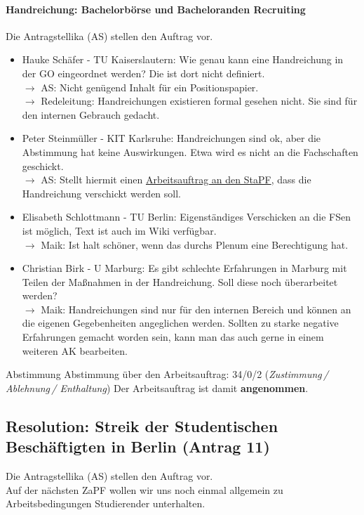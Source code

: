\paragraph{Handreichung: Bachelorbörse und Bacheloranden Recruiting}
    Die Antragstellika (AS) stellen den Auftrag vor.

    \begin{itemize}
      \item Hauke Schäfer - TU Kaiserslautern:  Wie genau kann eine Handreichung in der GO eingeordnet werden? Die ist dort nicht definiert. \\
        $\rightarrow$ AS: Nicht genügend Inhalt für ein Positionspapier. \\
        $\rightarrow$ Redeleitung: Handreichungen existieren formal gesehen nicht. Sie sind für den internen Gebrauch gedacht.
      \item Peter Steinmüller - KIT Karlsruhe:  Handreichungen sind ok, aber die Abstimmung hat keine Auswirkungen. Etwa wird es nicht an die Fachschaften geschickt. \\
        $\rightarrow$ AS: Stellt hiermit einen \uline{Arbeitsauftrag an den StaPF}, dass die Handreichung verschickt werden soll.
      \item Elisabeth Schlottmann - TU Berlin:  Eigenständiges Verschicken an die FSen ist möglich, Text ist auch im Wiki verfügbar. \\
        $\rightarrow$ Maik: Ist halt schöner, wenn das durchs Plenum eine Berechtigung hat.
      \item Christian Birk - U Marburg:  Es gibt schlechte Erfahrungen in Marburg mit Teilen der Maßnahmen in der Handreichung. Soll diese noch überarbeitet werden? \\
        $\rightarrow$ Maik: Handreichungen sind nur für den internen Bereich und können an die eigenen Gegebenheiten angeglichen werden. Sollten zu starke negative Erfahrungen gemacht worden sein, kann man das auch gerne in einem weiteren AK bearbeiten.
    \end{itemize}

    \begin{success}{Abstimmung}
      Abstimmung über den Arbeitsauftrag: 34/0/2 (\textit{Zustimmung\,/ Ablehnung\,/ Enthaltung})
      Der Arbeitsauftrag ist damit \textbf{angenommen}.
    \end{success}

  \subsection*{Resolution: Streik der Studentischen Beschäftigten in Berlin (Antrag 11)}
    Die Antragstellika (AS) stellen den Auftrag vor. \\
    Auf der nächsten ZaPF wollen wir uns noch einmal allgemein zu Arbeitsbedingungen Studierender unterhalten.

